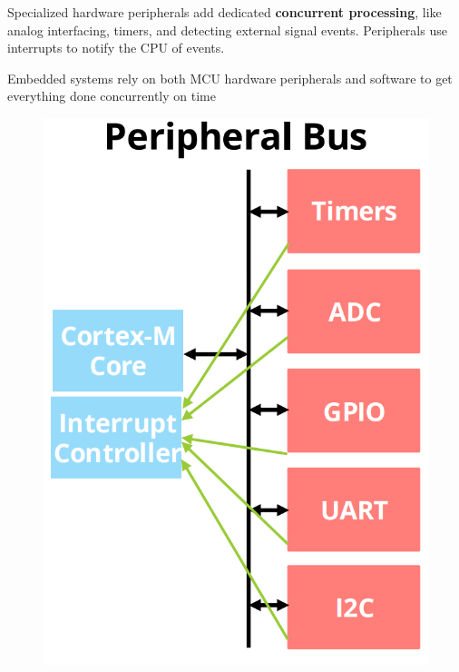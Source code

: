 Specialized hardware peripherals add dedicated \textbf{concurrent processing}, like analog interfacing, timers,
and detecting external signal events. Peripherals use interrupts to notify the CPU of events.

Embedded systems rely on both MCU hardware peripherals and software to get everything done concurrently on time


  \begin{minipage}{\linewidth}
      \centering
      \begin{minipage}{0.25\linewidth}
          \begin{figure}[H]
                \centering
                \includegraphics[width=1\linewidth]{img/image6.png}
          \end{figure}
      \end{minipage}
      \hspace{0.05\linewidth}

\end{minipage}
